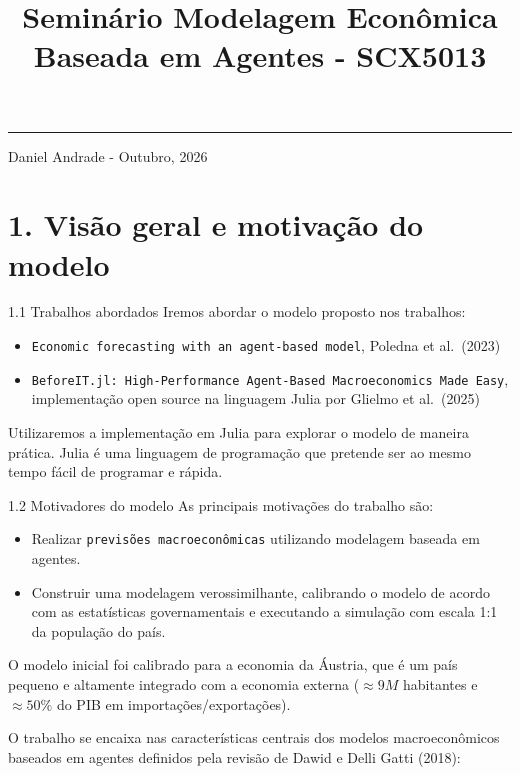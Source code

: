 \documentclass[aspectratio=169,11pt]{beamer}
\title{Seminário Modelagem Econômica Baseada em Agentes - SCX5013}
\date{}
\begin{document}
\begin{frame}[plain]\vfill{}\vspace{0.8cm}\par{\color{black}\rule{0.55\textwidth}{0.8pt}}\vspace{0.5cm}\par{\color{black} Daniel Andrade - Outubro, 2026}\vfill\end{frame}

\section{1. Visão geral e motivação do modelo}

\begin{frame}[allowframebreaks]{1.1 Trabalhos abordados}
\normalsize
Iremos abordar o modelo proposto nos trabalhos:

\begin{itemize}
\item
  \texttt{Economic\ forecasting\ with\ an\ agent-based\ model}, Poledna et al.~(2023)
\item
  \texttt{BeforeIT.jl:\ High-Performance\ Agent-Based\ Macroeconomics\ Made\ Easy}, implementação open source na linguagem Julia por Glielmo et al.~(2025)
\end{itemize}

Utilizaremos a implementação em Julia para explorar o modelo de maneira prática. Julia é uma linguagem de programação que pretende ser ao mesmo tempo fácil de programar e rápida.
\end{frame}


\begin{frame}[allowframebreaks]{1.2 Motivadores do modelo}
\normalsize
As principais motivações do trabalho são:

\begin{itemize}
\item
  Realizar \texttt{previsões\ macroeconômicas} utilizando modelagem baseada em agentes.
\item
  Construir uma modelagem verossimilhante, calibrando o modelo de acordo com as estatísticas governamentais e executando a simulação com escala 1:1 da população do país.
\end{itemize}

O modelo inicial foi calibrado para a economia da Áustria, que é um país pequeno e altamente integrado com a economia externa (\(\approx 9M\) habitantes e \(\approx 50\%\) do PIB em importações/exportações).

O trabalho se encaixa nas características centrais dos modelos macroeconômicos baseados em agentes definidos pela revisão de Dawid e Delli Gatti (2018):
\end{frame}
\end{document}
